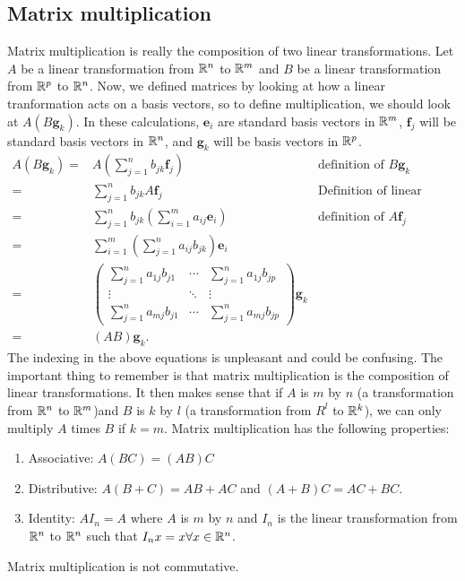 \subsection{Matrix multiplication}
Matrix multiplication is really the composition of two linear
transformations. Let $A$ be a linear transformation from $\mathbb{R}^n$ to
$\mathbb{R}^m$ and $B$ be a linear transformation from $\mathbb{R}^p$ to $\mathbb{R}^n$. Now,
we defined matrices by looking at how a linear tranformation acts on a
basis vectors, so to define multiplication, we should look at
$A(B \mathbf{g}_k)$. In these calculations, $\mathbf{e}_i$ are
standard basis vectors in $\mathbb{R}^m$, $\mathbf{f}_j$ will be standard
basis vectors in $\mathbb{R}^n$, and $\mathbf{g}_k$ will be basis vectors in
$\mathbb{R}^p$. 
\begin{align*}
  A(B \mathbf{g}_k) = & A (\sum_{j=1}^n b_{jk} \mathbf{f}_j) & \text{definition of $B\mathbf{g}_k$}\\
  = & \sum_{j=1}^n b_{jk} A \mathbf{f}_j & \text{Definition of linear
    transformtion} \\
  = & \sum_{j=1}^n b_{jk} \left(\sum_{i=1}^m a_{ij} \mathbf{e}_i\right)  &
  \text{definition of $A\mathbf{f}_j$} \\
  = & \sum_{i=1}^m \left(\sum_{j=1}^n a_{ij} b_{jk} \right) \mathbf{e}_i \\
  = & \begin{pmatrix} 
    \sum_{j=1}^n a_{1j} b_{j1} & \cdots & \sum_{j=1}^n a_{1j} b_{jp} \\
    \vdots & \ddots & \vdots \\
    \sum_{j=1}^n a_{mj} b_{j1} & \cdots & \sum_{j=1}^n a_{mj} b_{jp}
  \end{pmatrix} \mathbf{g}_k  \\
  = & (AB)\mathbf{g}_k .
\end{align*}
The indexing in the above equations is unpleasant and could be
confusing. The important thing to remember is that matrix
multiplication is the composition of linear transformations. It then
makes sense that if $A$ is $m$ by $n$ (a transformation from $\mathbb{R}^n$ to
$\mathbb{R}^m$)and $B$ is $k$ by $l$ (a transformation from $R^l$ to $\mathbb{R}^k$),
we can only multiply $A$ times $B$ if $k = m$. Matrix multiplication
has the following properties:
\begin{enumerate}
\item Associative: $A(BC) = (AB) C$
\item Distributive: $A(B+C) = AB + AC$ and $(A+B)C = AC + BC$. 
\item Identity: $AI_n = A$ where $A$ is $m$ by $n$ and $I_n$ is the linear
  transformation from $\mathbb{R}^n$ to $\mathbb{R}^n$ such that $I_nx = x \forall x \in
  \mathbb{R}^n$.
\end{enumerate}
Matrix multiplication is not commutative. 

